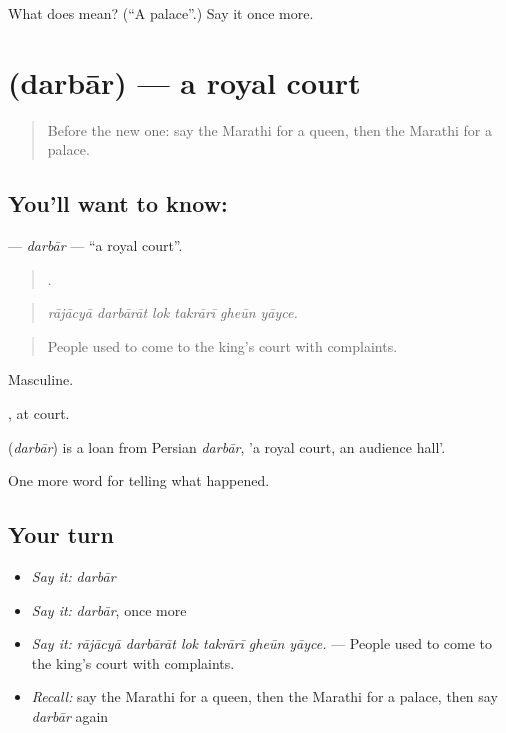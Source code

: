 \begin{tcolorbox}[breakable,colback=teal!4,colframe=teal!35!black,title={Before you move on}]
What does  mean? (\textquotedblleft{}A palace\textquotedblright{}.) Say it once more.
\end{tcolorbox}
\section[\texorpdfstring{\mr{दरबार} (darbār)}{दरबार (darbār)}]{ (darbār) — a royal court}

\label{lesson:MR-C325-darbar}



\begin{quote}
Before the new one: say the Marathi for a queen, then the Marathi for a palace.
\end{quote}

\subsection*{You'll want to know: }
\textbf{} — \emph{darbār} — \textquotedblleft{}a royal court\textquotedblright{}.

\begin{quote}
     .
\end{quote}

\begin{quote}
\emph{rājācyā darbārāt lok takrārī gheūn yāyce.}
\end{quote}

\begin{quote}
People used to come to the king's court with complaints.
\end{quote}

Masculine.

, at court.

\begin{cousinweb}
\textbf{} (\emph{darbār}) is a loan from Persian \emph{darbār}, 'a royal court, an audience hall'.
\end{cousinweb}

\begin{grammarlens}[title={What you've built}]
One more word for telling what happened.
\end{grammarlens}

\subsection*{Your turn}
\begin{itemize}
\raggedright
  \item \emph{Say it:} \emph{darbār}
  \item \emph{Say it:} \emph{darbār}, once more
  \item \emph{Say it:} \emph{rājācyā darbārāt lok takrārī gheūn yāyce.} — People used to come to the king's court with complaints.
  \item \emph{Recall:} say the Marathi for a queen, then the Marathi for a palace, then say \emph{darbār} again
\end{itemize}

